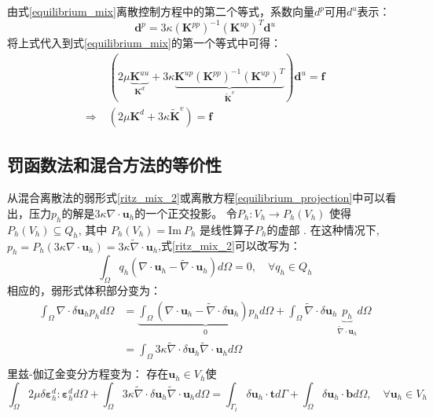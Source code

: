 由式\eqref{equilibrium_mix}离散控制方程中的第二个等式，系数向量$d^p$可用$d^u$表示：
\begin{equation}
    \boldsymbol d^p = 3\kappa(\boldsymbol K^{pp})^{-1} (\boldsymbol K^{up})^T \boldsymbol d^u
\end{equation}
将上式代入到式\eqref{equilibrium_mix}的第一个等式中可得：
\begin{equation}\label{equilibrium_projection}
    \begin{split}
        &(2\mu\underbrace{\boldsymbol K^{uu}}_{\boldsymbol K^d} + 3\kappa \underbrace{\boldsymbol K^{up}(\boldsymbol K^{pp})^{-1}(\boldsymbol K^{up})^{T}}_{\tilde{\boldsymbol K}^v}) \boldsymbol d^u = \boldsymbol f \\
        \Rightarrow\;& (2\mu \boldsymbol K^d + 3\kappa \tilde{\boldsymbol K}^v) = \boldsymbol f
    \end{split}
\end{equation}

\subsection{罚函数法和混合方法的等价性}
从混合离散法的弱形式\eqref{ritz_mix_2}或离散方程\eqref{equilibrium_projection}中可以看出，压力$p_h$的解是$3\kappa \nabla \cdot \boldsymbol u_h$的一个正交投影。
令$P_h: V_h \rightarrow P_h(V_h)$ 使得 $P_h(V_h) \subseteq Q_h$, 其中 $P_h(V_h) = \textrm{Im}\:P_h$ 是线性算子$P_h$的虚部 \cite{philippeg.2013}. 
在这种情况下, $p_h = P_h (3\kappa \nabla \cdot \boldsymbol u_h) = 3\kappa \tilde \nabla \cdot \boldsymbol u_h$,式\eqref{ritz_mix_2}可以改写为：
\begin{equation}
    \int_\Omega q_h(\nabla \cdot \boldsymbol u_h - \tilde \nabla \cdot \boldsymbol u_h) d\Omega = 0, \quad \forall q_h \in Q_h
\end{equation}
相应的，弱形式体积部分变为：
\begin{equation}\label{projection_mixed}
    \begin{split}
        \int_\Omega \nabla \cdot \delta \boldsymbol u_h p_h d\Omega &= \underbrace{\int_\Omega (\nabla \cdot \boldsymbol u_h - \tilde \nabla \cdot \delta \boldsymbol u_h) p_h d\Omega}_0 + \int_\Omega \tilde \nabla \cdot \delta \boldsymbol u_h \underbrace{p_h}_{\tilde \nabla \cdot \boldsymbol u_h} d\Omega \\
        &= \int_\Omega 3\kappa \tilde \nabla \cdot \delta \boldsymbol u_h \tilde \nabla \cdot \boldsymbol u_h d\Omega \\
    \end{split}
\end{equation}
里兹-伽辽金变分方程变为：
存在$\boldsymbol u_h \in V_h$使
\begin{equation}
    \int_\Omega 2\mu \delta \boldsymbol \varepsilon^d_h : \boldsymbol \varepsilon^d_h d\Omega +
    \int_\Omega 3\kappa \tilde \nabla \cdot \delta \boldsymbol u_h \tilde \nabla \cdot \boldsymbol u_h d\Omega =
    \int_{\Gamma_t} \delta \boldsymbol u_h \cdot \boldsymbol t d\Gamma + \int_\Omega \delta \boldsymbol u_h \cdot \boldsymbol b d\Omega, \quad \forall \boldsymbol u_h \in V_h
\end{equation}


